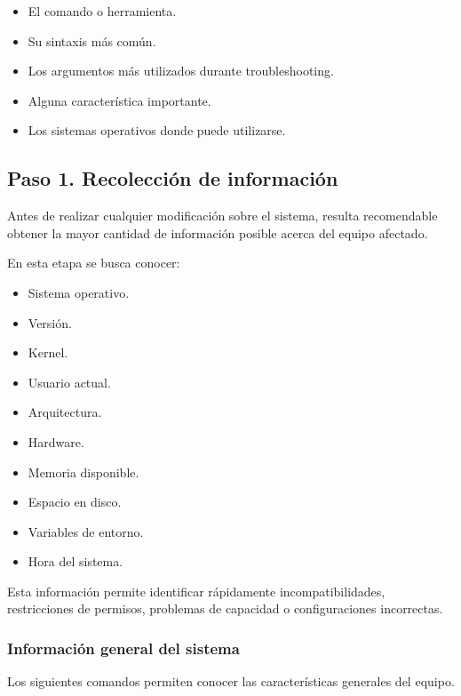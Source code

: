 \documentclass[a4paper,10pt]{article}
\begin{document}
\begin{itemize}
\item El comando o herramienta.
\item Su sintaxis más común.
\item Los argumentos más utilizados durante troubleshooting.
\item Alguna característica importante.
\item Los sistemas operativos donde puede utilizarse.
\end{itemize}


\subsection{Paso 1. Recolección de información}

Antes de realizar cualquier modificación sobre el sistema, resulta recomendable
obtener la mayor cantidad de información posible acerca del equipo afectado.

En esta etapa se busca conocer:

\begin{itemize}
\item Sistema operativo.
\item Versión.
\item Kernel.
\item Usuario actual.
\item Arquitectura.
\item Hardware.
\item Memoria disponible.
\item Espacio en disco.
\item Variables de entorno.
\item Hora del sistema.
\end{itemize}

Esta información permite identificar rápidamente incompatibilidades,
restricciones de permisos, problemas de capacidad o configuraciones
incorrectas.


\subsubsection{Información general del sistema}

Los siguientes comandos permiten conocer las características generales del
equipo.
\end{document}
